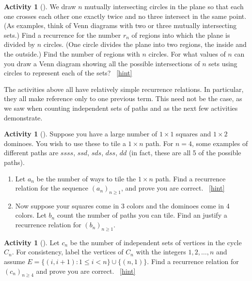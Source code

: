 \documentclass[10pt,]{book}
\theoremstyle{plain}
\theoremstyle{definition}
\theoremstyle{definition}
\theoremstyle{definition}
\newtheorem{activity}[project]{Activity}
\numberwithin{equation}{chapter}
\def\st{:}
\newcommand{\lt}{<}
\begin{document}
\begin{activity}[]\label{circlesinplane}
\hypertarget{p-470}{}%
We draw \(n\) mutually intersecting circles in the plane so that each one crosses each other one exactly twice and no three intersect in the same point. (As examples, think of Venn diagrams with two or three mutually intersecting sets.) Find a recurrence for the number \(r_n\) of regions into which the plane is divided by \(n\) circles. (One circle divides the plane into two regions, the inside and the outside.) Find the number of regions with \(n\) circles. For what values of \(n\) can you draw a Venn diagram showing all the possible intersections of \(n\) sets using circles to represent each of the sets?%
~\hfill{\tiny\hyperlink{a-76}{[hint]}\hypertarget{q-76}{}}\end{activity}
\hypertarget{p-475}{}%
The activities above all have relatively simple recurrence relations.  In particular, they all make reference only to one previous term.  This need not be the case, as we saw when counting independent sets of paths and as the next few activities demonstrate.%
\begin{activity}[]\label{act-dominoes}
\hypertarget{p-476}{}%
Suppose you have a large number of \(1\times 1\) squares and \(1 \times 2\) dominoes.  You wish to use these to tile a \(1 \times n\) path.  For \(n = 4\), some examples of different paths are \(ssss\), \(ssd\), \(sds\), \(dss\), \(dd\) (in fact, these are all 5 of the possible paths).%
\begin{enumerate}[font=\bfseries,label=(\alph*),ref=\alph*]
\item\label{task-102} \hypertarget{p-477}{}%
Let \(a_n\) be the number of ways to tile the \(1 \times n\) path.  Find a recurrence relation for the sequence \((a_n)_{n \ge 1}\), and prove you are correct.%
~\hfill{\tiny\hyperlink{a-77.a}{[hint]}\hypertarget{q-77.a}{}}\item\label{task-103} \hypertarget{p-479}{}%
Now suppose your squares come in 3 colors and the dominoes come in 4 colors.  Let \(b_n\) count the number of paths you can tile.  Find an justify a recurrence relation for \((b_n)_{n \ge 1}\).%
\end{enumerate}
\end{activity}
\begin{activity}[]\label{activity-78}
\hypertarget{p-480}{}%
Let \(c_n\) be the number of independent sets of vertices in the cycle \(C_n\).  For consistency, label the vertices of \(C_n\) with the integers \(1, 2, \ldots, n\) and assume \(E = \{(i, i+1) \st 1 \le i \lt n\} \cup \{(n, 1)\}\). Find a recurrence relation for \((c_n)_{n\ge 4}\) and prove you are correct.%
~\hfill{\tiny\hyperlink{a-78}{[hint]}\hypertarget{q-78}{}}\end{activity}
\end{document}
